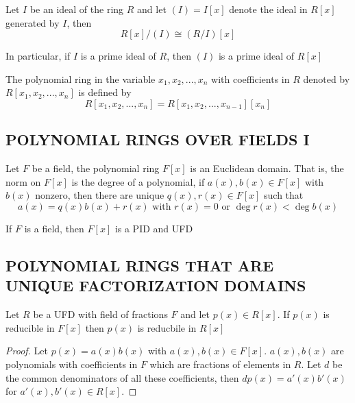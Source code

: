\begin{proposition}
	Let $I$ be an ideal of the ring $R$ and let $(I) = I[x]$ denote the ideal in $R[x]$ generated by $I$, then
	$$
		R[x] / (I) \cong (R / I)[x]
	$$
	
	In particular, if $I$ is a prime ideal of $R$, then $(I)$ is a prime ideal of $R[x]$
\end{proposition}

\begin{definition}
	The polynomial ring in the variable $x_1, x_2, ..., x_n$ with coefficients in $R$ denoted by $R[x_1, x_2, ..., x_n]$ is defined by
	$$
		R[x_1, x_2, ..., x_n] = R[x_1, x_2, ..., x_{n-1}][x_n]
	$$
\end{definition}

\subsection{POLYNOMIAL RINGS OVER FIELDS I}

\begin{theorem}
	Let $F$ be a field, the polynomial ring $F[x]$ is an Euclidean domain. That is, the norm on $F[x]$ is the degree of a polynomial, if $a(x), b(x) \in F[x]$ with $b(x)$ nonzero, then there are unique $q(x), r(x) \in F[x]$ such that
	$$
		a(x) = q(x) b(x) + r(x) \text{ with } r(x) = 0 \text{ or } \deg r(x) < \deg b(x)
	$$
\end{theorem}

\begin{corollary}
	If $F$ is a field, then $F[x]$ is a PID and UFD
\end{corollary}


\subsection{POLYNOMIAL RINGS THAT ARE \\ UNIQUE FACTORIZATION DOMAINS}

\begin{proposition}
	Let $R$ be a UFD with field of fractions $F$ and let $p(x) \in R[x]$. If $p(x)$ is reducible in $F[x]$ then $p(x)$ is reducbile in $R[x]$
\end{proposition}

\begin{proof}
	Let $p(x) = a(x) b(x)$ with $a(x), b(x) \in F[x]$. $a(x), b(x)$ are polynomials with coefficients in $F$ which are fractions of elements in $R$. Let $d$ be the common denominators of all these coefficients, then $d p(x) = a'(x) b'(x)$ for $a'(x), b'(x) \in R[x]$. 
\end{proof}

